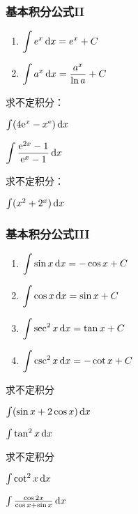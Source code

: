 \documentclass[14pt,notheorems,leqno,xcolor={rgb}]{beamer} %
\begin{document}
\begin{frame}[label=intformula2]
\frametitle{基本积分公式II}
\begin{enumerate}[<+->]
  \conti
  \item $\displaystyle\int e^x \mathop{}\!\mathrm{d}{x} = e^x + C$
  \item $\displaystyle\int a^x \mathop{}\!\mathrm{d}{x} = \frac{a^x}{\ln a} + C$
  \seti
\end{enumerate}
\end{frame}

\begin{frame}
\begin{example}
求不定积分：
\begin{enumlite}
  \item $\int (4\mathrm{e}^x-x^{\mathrm{e}})\mathop{}\!\mathrm{d} x$
  \item $\Int \dfrac{\e^{2x}-1}{\e^x-1}\dx$
\end{enumlite}
\end{example}
\vpause
\begin{exercise}
求不定积分：
\begin{enumlite}
  \item $\int (x^2+2^x) \mathop{}\!\mathrm{d}{x}$
\end{enumlite}
\end{exercise}
\end{frame}

\begin{frame}[label=intformula3]
\frametitle{基本积分公式III}
\begin{enumerate}[<+->]
  \conti
  \item $\displaystyle\int \sin x \mathop{}\!\mathrm{d}{x}= - \cos x + C$
  \item $\displaystyle\int \cos x \mathop{}\!\mathrm{d}{x}= \sin x + C$
  \item $\displaystyle\int \sec^2 x \mathop{}\!\mathrm{d}{x}= \tan x + C$
  \item $\displaystyle\int \csc^2 x \mathop{}\!\mathrm{d}{x}= -\cot x + C$
  \seti
\end{enumerate}
\end{frame}

\begin{frame}
\begin{example}
求不定积分
\begin{enumlite}
  \item $\int (\sin x + 2\cos x) \mathop{}\!\mathrm{d}{x}$
  \item $\int \tan^2x \mathop{}\!\mathrm{d}{x}$
\end{enumlite}
\end{example}
\vpause
\begin{exercise}
求不定积分
\begin{enumlite}
  \item $\int \cot^2 x \mathop{}\!\mathrm{d}{x}$
  \item $\int \frac{\cos 2x}{\cos x + \sin x} \mathop{}\!\mathrm{d}{x}$
\end{enumlite}
\end{exercise}
\end{frame}
\end{document}

